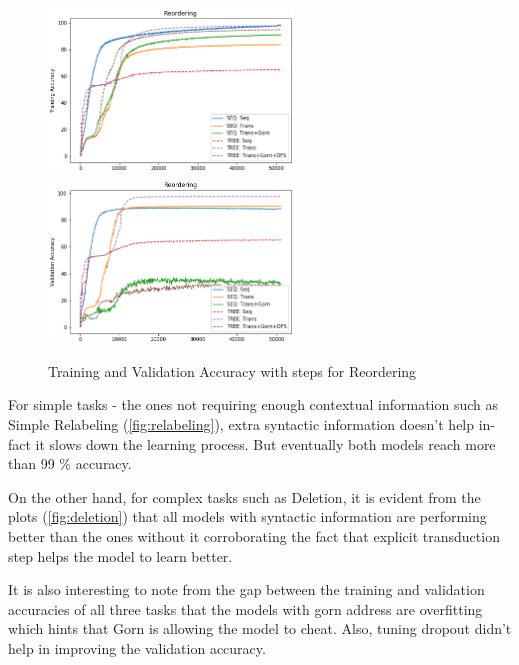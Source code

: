 \documentclass{article}
\begin{document}
\begin{figure}[H]
\includegraphics[width=6.5cm]{pictures/Reordering_Validation.png}
\includegraphics[width=6.5cm]{pictures/Reordering_Training.png}
    \caption{Training and Validation Accuracy with steps for Reordering}
    \label{fig:reordering}
\end{figure}

For simple tasks - the ones not requiring enough contextual information such as Simple Relabeling (\autoref{fig:relabeling}), extra syntactic information doesn't help in-fact it slows down the learning process. But eventually both models reach more than 99 \% accuracy. \par
On the other hand, for complex tasks such as Deletion, it is evident from the plots (\autoref{fig:deletion}) that all models with syntactic information are performing better than the ones without it corroborating the fact that explicit transduction step helps the model to learn better. \par
It is also interesting to note from the gap between the training and validation accuracies of all three tasks that the models with gorn address are overfitting which hints that Gorn is allowing the model to cheat. Also, tuning dropout didn't help in improving the validation accuracy.





\end{document}
